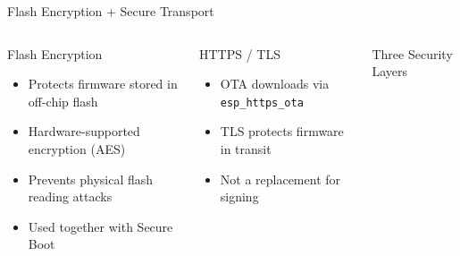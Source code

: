 \documentclass[aspectratio=169]{beamer}
\begin{document}
\begin{frame}{Flash Encryption + Secure Transport}

\begin{columns}[T]
\begin{block}{Flash Encryption}
\begin{itemize}\small
  \item Protects firmware stored in off-chip flash
  \item Hardware-supported encryption (AES)
  \item Prevents physical flash reading attacks
  \item Used together with Secure Boot
\end{itemize}
\end{block}

\vspace{4pt}
\begin{block}{HTTPS / TLS}
\begin{itemize}\small
  \item OTA downloads via \texttt{esp\_https\_ota}
  \item TLS protects firmware in transit
  \item Not a replacement for signing
\end{itemize}
\end{block}

\begin{block}{Three Security Layers}
\centering
{}
\end{block}
\end{columns}

\end{frame}
\end{document}

